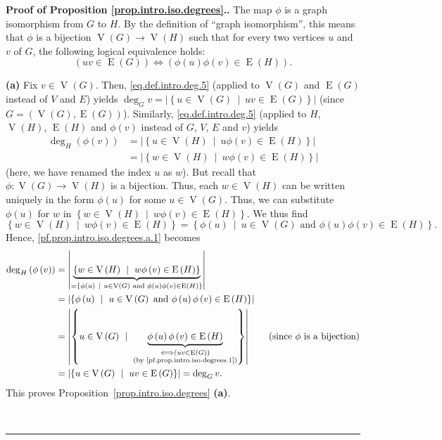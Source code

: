 \documentclass[numbers=enddot,12pt,final,onecolumn,notitlepage]{scrartcl}%
\theoremstyle{definition}
\newenvironment{proof}[1][Proof]{\noindent\textbf{#1.} }{\ \rule{0.5em}{0.5em}}
\newcommand{\set}[1]{\left\{ #1 \right\}}
\newcommand{\abs}[1]{\left| #1 \right|}
\newcommand{\tup}[1]{\left( #1 \right)}
\newcommand{\verts}[1]{\operatorname{V}\left( #1 \right)}
\newcommand{\edges}[1]{\operatorname{E}\left( #1 \right)}
\begin{document}
\begin{proof}[Proof of Proposition \ref{prop.intro.iso.degrees}.]
The map $\phi$ is a graph isomorphism from $G$ to $H$. By the
definition of ``graph isomorphism'', this means that $\phi$ is a
bijection $\verts{G} \to \verts{H}$ such that for every two
vertices $u$ and $v$ of $G$, the following logical equivalence holds:
\begin{equation}
\left( uv \in \edges{G} \right)
\Longleftrightarrow
\left( \phi\tup{u}\phi\tup{v} \in \edges{H} \right) .
\label{pf.prop.intro.iso.degrees.1}
\end{equation}

\textbf{(a)} Fix $v \in \verts{G}$. Then, \eqref{eq.def.intro.deg.5}
(applied to $\verts{G}$ and $\edges{G}$ instead of $V$ and $E$)
yields
$\deg_G v = \abs{\set{u \in \verts{G} \ \mid \ uv \in \edges{G}}}$
(since $G = \tup{\verts{G}, \edges{G}}$).
Similarly,
\eqref{eq.def.intro.deg.5} (applied to $H$, $\verts{H}$, $\edges{H}$
and $\phi\tup{v}$ instead of $G$, $V$, $E$ and $v$) yields
\begin{align}
\deg_H \tup{\phi\tup{v}}
&=
\abs{\set{u \in \verts{H} \ \mid \ u \phi\tup{v} \in \edges{H}}}
\nonumber \\
&=
\abs{\set{w \in \verts{H} \ \mid \ w \phi\tup{v} \in \edges{H}}}
\label{pf.prop.intro.iso.degrees.a.1}
\end{align}
(here, we have renamed the index $u$ as $w$).
But recall that $\phi : \verts{G} \to \verts{H}$ is a bijection. Thus,
each $w \in \verts{H}$ can be written uniquely in the form
$\phi\tup{u}$ for some $u \in \verts{G}$. Thus, we can substitute
$\phi\tup{u}$ for $w$ in
$\set{w \in \verts{H} \ \mid \ w \phi\tup{v} \in \edges{H}}$.
We thus find
\[
\set{w \in \verts{H} \ \mid \ w \phi\tup{v} \in \edges{H}}
= \set{\phi\tup{u} \ \mid \ u \in \verts{G} \text{ and }
\phi\tup{u}\phi\tup{v} \in \edges{H}} .
\]
Hence,
\eqref{pf.prop.intro.iso.degrees.a.1} becomes
\begin{align*}
\deg_H \tup{\phi\tup{v}}
&=
\abs{
\underbrace{\set{w \in \verts{H} \ \mid \ w \phi\tup{v}
             \in \edges{H}}}
            _{= \set{\phi\tup{u} \ \mid \ u \in \verts{G}
              \text{ and } \phi\tup{u} \phi\tup{v} \in \edges{H}}}}
\\
&=
\abs{\set{\phi\tup{u} \ \mid \ u \in \verts{G}
          \text{ and } \phi\tup{u} \phi\tup{v} \in \edges{H}}} \\
&=
\abs{\set{u \in \verts{G} \ \mid
          \ \underbrace{\phi\tup{u} \phi\tup{v} \in \edges{H}}
                 _{\substack{\Longleftrightarrow
                     \left( uv \in \edges{G} \right) \\
                     \text{(by \eqref{pf.prop.intro.iso.degrees.1})}}}
          }}
\qquad \left(\text{since } \phi \text{ is a bijection}\right) \\
&= \abs{\set{u \in \verts{G} \ \mid \ uv \in \edges{G}}}
= \deg_G v .
\end{align*}
This proves Proposition~\ref{prop.intro.iso.degrees} \textbf{(a)}.
\medskip


\end{proof}
\end{document}

